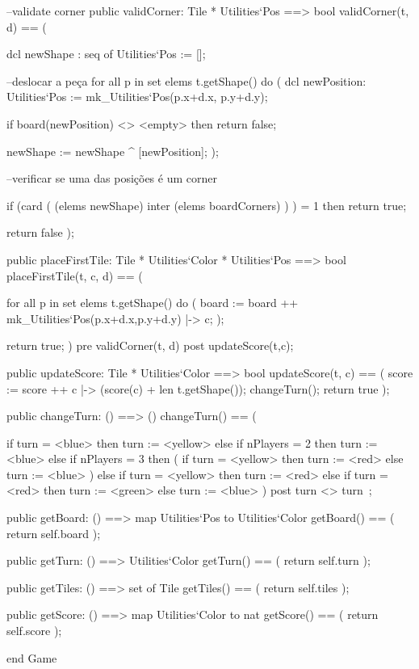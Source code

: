 \begin{vdm_al}
     --validate corner
        public validCorner: Tile * Utilities`Pos ==> bool
         validCorner(t, d) == (
          
    dcl newShape : seq of Utilities`Pos := [];

    --deslocar a peça
    for all p in set elems t.getShape() do (
     dcl newPosition: Utilities`Pos := mk_Utilities`Pos(p.x+d.x, p.y+d.y);
           
           if board(newPosition) <> <empty> then
            return false;
            
        newShape := newShape ^ [newPosition];
          );
          
       --verificar se uma das posições é um corner
       
          if (card ( (elems newShape) inter (elems boardCorners) ) ) = 1 then
           return true;

          return false
         );
     
        public placeFirstTile: Tile * Utilities`Color * Utilities`Pos ==> bool
      placeFirstTile(t, c, d) == (
       
          for all p in set elems t.getShape() do ( 
           board := board ++ {mk_Utilities`Pos(p.x+d.x,p.y+d.y) |-> c};
          );

       return true;
      )
      pre validCorner(t, d)
      post updateScore(t,c);
      
     public updateScore: Tile * Utilities`Color ==> bool
      updateScore(t, c) == (
       score := score ++ {c |-> (score(c) + len t.getShape())};
       changeTurn();
       return true
      );
         
  public changeTurn: () ==> ()
         changeTurn() == (
         
             if turn = <blue> then 
              turn := <yellow>
             else if nPlayers = 2 then
                 turn := <blue>
                else if nPlayers = 3 then (
                 if turn = <yellow> then
                  turn := <red>
              else
               turn := <blue>
                 )
             else if turn = <yellow> then
              turn := <red>
             else if turn = <red> then
              turn := <green>
          else
           turn := <blue>                
         )
         post turn <> turn~;
        
        public getBoard: () ==> map Utilities`Pos to Utilities`Color
         getBoard() == (
          return self.board
         );
         
     public getTurn: () ==> Utilities`Color
         getTurn() == (
          return self.turn
         );
         
     public getTiles: () ==> set of Tile
      getTiles() == (
       return self.tiles
      );
      
  public getScore: () ==> map Utilities`Color to nat
      getScore() == (
       return self.score
      );

end Game
\end{vdm_al}
